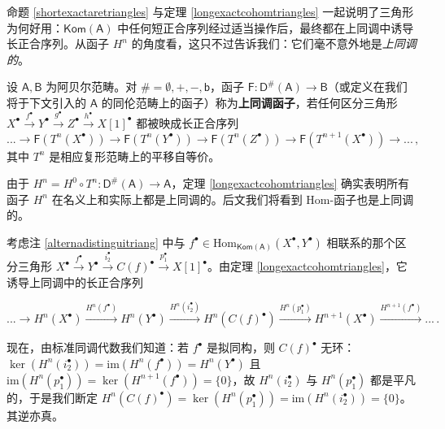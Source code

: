 
命题 \ref{shortexactaretriangles} 与定理 \ref{longexactcohomtriangles} 一起说明了三角形为何好用：$\mathsf{Kom(A)}$ 中任何短正合序列经过适当操作后，最终都在上同调中诱导长正合序列。从函子 $H^n$ 的角度看，这只不过告诉我们：它们毫不意外地是\textit{上同调的}。

\begin{Def}\label{cohomfunconabelian}
设 $\mathsf{A}, \mathsf{B}$ 为阿贝尔范畴。对 $\#=\emptyset, +, -, \mathsf{b}$，函子 $\mathsf{F}:\mathsf{D^\#\!(A)}\rightarrow\mathsf{B}$（或定义在我们将于下文引入的 $\mathsf{A}$ 的同伦范畴上的函子）称为\textbf{上同调函子}，若任何区分三角形 $X^\bullet\xrightarrow{f^\bullet} Y^\bullet\xrightarrow{g^\bullet} Z^\bullet\xrightarrow{h^\bullet} X[1]^\bullet$ 都被映成长正合序列
\[
...\rightarrow\mathsf{F}(T^n(X^\bullet))\rightarrow\mathsf{F}(T^n(Y^\bullet))\rightarrow\mathsf{F}(T^n(Z^\bullet))\rightarrow\mathsf{F}(T^{n+1}(X^\bullet))\rightarrow...\,,
\]
其中 $T^n$ 是相应复形范畴上的平移自等价。
\end{Def}


由于 $H^n=H^0\circ T^n:\mathsf{D^\#\!(A)}\rightarrow\mathsf{A}$，定理 \ref{longexactcohomtriangles} 确实表明所有函子 $H^n$ 在名义上和实际上都是上同调的。后文我们将看到 $\text{Hom}$-函子也是上同调的。

\begin{Rem}\label{C(f)acyclic}
考虑注 \ref{alternadistinguitriang} 中与 $f^\bullet\in\text{Hom}_\mathsf{Kom(A)}(X^\bullet,Y^\bullet)$ 相联系的那个区分三角形 $X^\bullet\xrightarrow{f^\bullet} Y^\bullet\xrightarrow{i_2^\bullet} C(f)^\bullet\xrightarrow{p_1^\bullet} X[1]^\bullet$。由定理 \ref{longexactcohomtriangles}，它诱导上同调中的长正合序列
\begin{small}\[
	...\rightarrow H^n(X^\bullet)\xrightarrow{H^n(f^\bullet)} H^n(Y^\bullet)\xrightarrow{H^n(i_2^\bullet)} H^n(C(f)^\bullet)\xrightarrow{H^n(p_1^\bullet)} H^{n+1}(X^\bullet)\xrightarrow{H^{n+1}(f^\bullet)}...\,.
	\]\end{small}
\!\!现在，由标准同调代数我们知道：若 $f^\bullet$ 是拟同构，则 $C(f)^\bullet$ 无环：$\ker(H^n(i_2^\bullet))=\text{im}(H^n(f^\bullet))=H^n(Y^\bullet)$ 且 $\text{im}(H^n(p_1^\bullet))=\ker(H^{n+1}(f^\bullet))=\{0\}$，故 $H^n(i_2^\bullet)$ 与 $H^n(p_1^\bullet)$ 都是平凡的，于是我们断定 $H^n(C(f)^\bullet)=\ker(H^n(p_1^\bullet))=\text{im}(H^n(i_2^\bullet))=\{0\}$。其逆亦真。 
\end{Rem}

